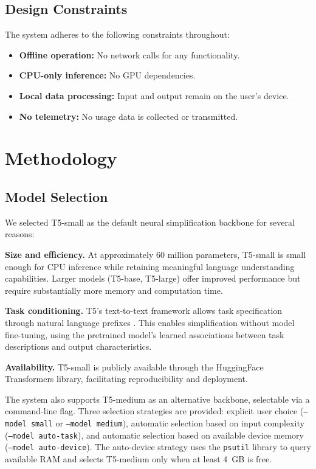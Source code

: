 \documentclass[11pt]{article}
\begin{document}
\subsection{Design Constraints}

The system adheres to the following constraints throughout:
\begin{itemize}
    \item \textbf{Offline operation:} No network calls for any functionality.
    \item \textbf{CPU-only inference:} No GPU dependencies.
    \item \textbf{Local data processing:} Input and output remain on the user's device.
    \item \textbf{No telemetry:} No usage data is collected or transmitted.
\end{itemize}

\section{Methodology}

\subsection{Model Selection}

We selected T5-small as the default neural simplification backbone for several reasons:

\textbf{Size and efficiency.} At approximately 60 million parameters, T5-small is small enough for CPU inference while retaining meaningful language understanding capabilities. Larger models (T5-base, T5-large) offer improved performance but require substantially more memory and computation time.

\textbf{Task conditioning.} T5's text-to-text framework allows task specification through natural language prefixes \citep{raffel2020}. This enables simplification without model fine-tuning, using the pretrained model's learned associations between task descriptions and output characteristics.

\textbf{Availability.} T5-small is publicly available through the HuggingFace Transformers library, facilitating reproducibility and deployment.

The system also supports T5-medium as an alternative backbone, selectable via a command-line flag. Three selection strategies are provided: explicit user choice (\texttt{--model small} or \texttt{--model medium}), automatic selection based on input complexity (\texttt{--model auto-task}), and automatic selection based on available device memory (\texttt{--model auto-device}). The auto-device strategy uses the \texttt{psutil} library to query available RAM and selects T5-medium only when at least 4~GB is free.
\end{document}
